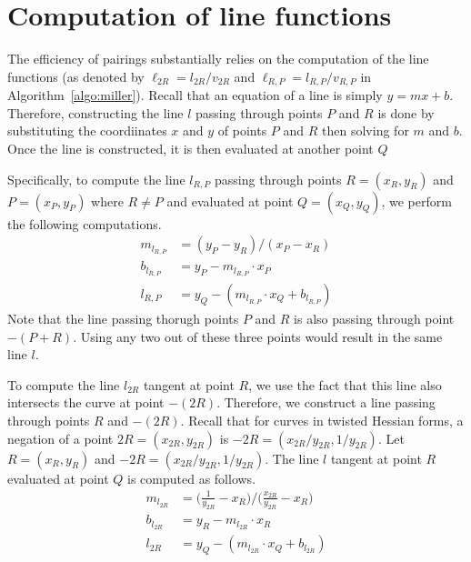 \section{Computation of line functions}
\label{sec:lines}

The efficiency of pairings substantially relies on the computation of the line functions
(as denoted by $\ell_{2R} = l_{2R}/v_{2R}$ and $\ell_{R,P} = l_{R,P}/v_{R,P}$ in Algorithm~\ref{algo:miller}).
Recall that an equation of a line is simply $y = mx + b$.
Therefore, constructing the line $l$ passing through points $P$ and $R$
is done by substituting the coordiinates $x$ and $y$ of points $P$ and $R$
then solving for $m$ and $b$.
Once the line is constructed, it is then evaluated at another point $Q$

Specifically, to compute the line $l_{R,P}$ passing through
points $R = (x_R, y_R)$ and $P = (x_P, y_P)$ where $R \ne P$
and evaluated at point $Q = (x_Q, y_Q)$,
we perform the following computations.
\begin{align*}
m_{l_{R,P}} &= (y_P - y_R)/(x_P - x_R)			\\
b_{l_{R,P}} &= y_P - m_{l_{R,P}} \cdot x_P		\\
l_{R,P} &= y_Q - (m_{l_{R,P}} \cdot x_Q + b_{l_{R,P}}) 
\end{align*}
Note that %
the line passing thorugh points $P$ and $R$ is also passing through point $-(P+R)$.
Using any two out of these three points would result in the same line $l$.

To compute the line $l_{2R}$ tangent at point $R$,
we use the fact that this line also intersects the curve at point $-(2R)$.
Therefore, we construct a line passing through points $R$ and $-(2R)$.
Recall that for curves in twisted Hessian forms,
a negation of a point $2R = (x_{2R}, y_{2R})$ is $-2R = (x_{2R}/y_{2R}, 1/y_{2R})$.
Let $R = (x_{R}, y_{R})$
and $-2R = (x_{2R}/y_{2R}, 1/y_{2R})$. %
The line $l$ tangent at point $R$ evaluated at point $Q$ is computed as follows.
\begin{align*}
m_{l_{2R}} &= \bigg( \frac{1}{y_{2R}} - x_{R} \bigg) / \bigg( \frac{x_{2R}}{y_{2R}} - x_{R} \bigg)	\\
b_{l_{2R}} &= y_R - m_{l_{2R}} \cdot x_R		\\
l_{2R} &= y_Q - (m_{l_{2R}} \cdot x_Q + b_{l_{2R}})
\end{align*}

